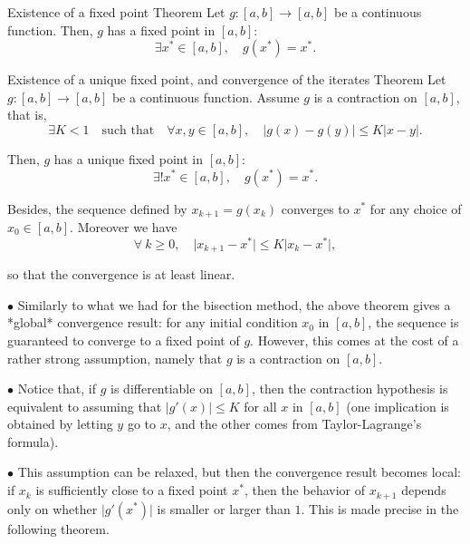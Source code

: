 \documentclass{article}
\begin{document}
        \begin{theorem}{Existence of a fixed point Theorem}
            Let $g: [a,b]\to [a,b]$ be a continuous function. Then,  $g$ has a fixed point in $[a,b]$:
            $$
            \exists x^*\in[a,b],\quad{} g(x^*)=x^*.
            $$
        \end{theorem}

        \vspace{10pt}

        \begin{theorem}{Existence of a unique fixed point, and convergence of the iterates Theorem}
            Let $g: [a,b]\to [a,b]$ be a continuous function. Assume $g$ is a contraction on $[a,b]$, that is,
            $$
            \exists K<1 \quad{} \text{such that} \quad{} \forall x,y\in[a,b], \quad{} \vert g(x) - g(y)\vert \leq K \vert x-y\vert.
            $$
            
            Then,  $g$ has a unique fixed point in $[a,b]$:
            $$
            \exists ! x^*\in[a,b],\quad{} g(x^*)=x^*.
            $$
            
            Besides, the sequence defined by $x_{k+1}=g(x_k)$ converges to $x^*$ for any choice of $x_0\in [a,b]$. Moreover we have
            $$
            \forall~k\geq 0,\quad{} \vert x_{k+1} - x^* \vert \leq K \vert x_{k} - x^*\vert,
            $$
            
            so that the convergence is at least linear.
        \end{theorem}

        \vspace{10pt}

        \begin{remark}
            $\bullet$ Similarly to what we had for the bisection method, the above theorem gives a *global* convergence result: for any initial condition $x_0$ in $[a,b]$, the sequence is guaranteed to converge to a fixed point of $g$. However, this comes at the cost of a rather strong assumption, namely that $g$ is a contraction on $[a,b]$.

            \vspace{6pt}

            $\bullet$ Notice that, if $g$ is differentiable on $[a,b]$, then the contraction hypothesis is equivalent to assuming that $\vert g'(x)\vert \leq K$ for all $x$ in $[a,b]$ (one implication is obtained by letting $y$ go to $x$, and the other comes from Taylor-Lagrange's formula).

            \vspace{6pt}

            $\bullet$ This assumption can be relaxed, but then the convergence result becomes local: if $x_k$ is sufficiently close to a fixed point $x^*$, then the behavior of $x_{k+1}$ depends only on whether $\vert g'(x^*) \vert$ is smaller or larger than $1$. This is made precise in the following theorem.
        \end{remark}
\end{document}
